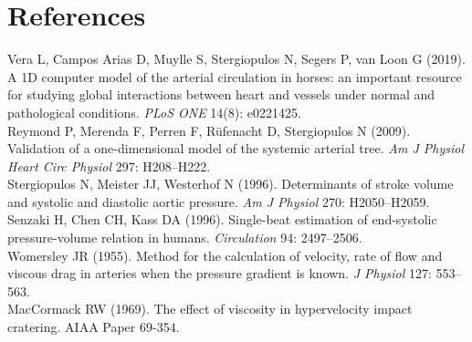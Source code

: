 \documentclass[10pt]{article}
\begin{document}
\section*{References}
\small
Vera L, Campos Arias D, Muylle S, Stergiopulos N, Segers P, van Loon G (2019). A 1D computer model of the arterial
circulation in horses: an important resource for studying global interactions between heart and vessels under
normal and pathological conditions. \emph{PLoS ONE} 14(8): e0221425.\\
Reymond P, Merenda F, Perren F, R\"ufenacht D, Stergiopulos N (2009). Validation of a one-dimensional model of the
systemic arterial tree. \emph{Am J Physiol Heart Circ Physiol} 297: H208--H222.\\
Stergiopulos N, Meister JJ, Westerhof N (1996). Determinants of stroke volume and systolic and diastolic aortic
pressure. \emph{Am J Physiol} 270: H2050--H2059.\\
Senzaki H, Chen CH, Kass DA (1996). Single-beat estimation of end-systolic pressure-volume relation in humans.
\emph{Circulation} 94: 2497--2506.\\
Womersley JR (1955). Method for the calculation of velocity, rate of flow and viscous drag in arteries when the
pressure gradient is known. \emph{J Physiol} 127: 553--563.\\
MacCormack RW (1969). The effect of viscosity in hypervelocity impact cratering. AIAA Paper 69-354.
\end{document}
